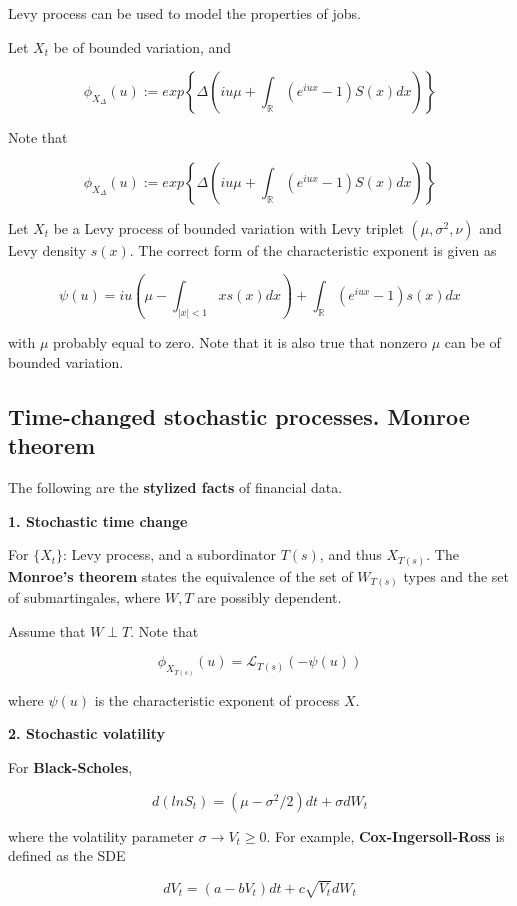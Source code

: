 \documentclass[12pt]{article}
\theoremstyle{nonumberbreak}
\begin{document}
Levy process can be used to model the properties of jobs. 


Let $X_t$ be of bounded variation, and 

$$
\phi_{X_\Delta} (u) := exp \left\{  \Delta \left( iu\mu + \int_\mathbb{R} (e^{iux} - 1) S(x) dx \right)  \right\}
$$

Note that 

$$
\phi_{X_\Delta} (u) := exp \left\{  \Delta \left( iu\mu + \int_\mathbb{R} (e^{iux} - 1) S(x) dx \right)  \right\}
$$


Let $X_t$ be a Levy process of bounded variation with Levy triplet $(\mu, \sigma^2, \nu)$ and Levy density $s(x)$. The correct form of the characteristic exponent is given as

$$
\psi (u) = iu \left( \mu - \int_{|x| < 1} x s(x) dx  \right) + \int_\mathbb{R} (e^{iux} - 1) s(x) dx
$$

with $\mu$ probably equal to zero. Note that it is also true that nonzero $\mu$ can be of bounded variation. 



\subsection{Time-changed stochastic processes. Monroe theorem}

The following are the \textbf{stylized facts} of financial data. 

\textbf{1. Stochastic time change} 

For $\{ X_t \}$: Levy process, and a subordinator $T(s)$, and thus $X_{T(s)}$. The \textbf{Monroe's theorem} states the equivalence of the set of $W_{T(s)}$ types and the set of submartingales, where $W, T$ are possibly dependent. 

Assume that $W \perp T$. Note that 

$$
\phi_{X_{T(s)}} (u) = \mathcal{L}_{T(s)} \left( - \psi(u) \right)
$$

where $\psi(u)$ is the characteristic exponent of process $X$. 



\textbf{2. Stochastic volatility}

For \textbf{Black-Scholes},

$$
d(ln S_t) = \left( \mu - \sigma^2/2 \right)dt + \sigma dW_t
$$ 

where the volatility parameter $\sigma \to V_t \ge 0$. For example, \textbf{Cox-Ingersoll-Ross} is defined as the SDE

$$
dV_t = (a - bV_t) dt + c \sqrt{V_t} d W_t
$$
\end{document}
